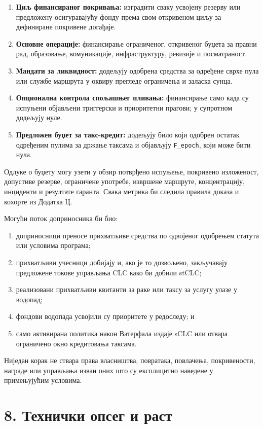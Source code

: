 \documentclass[11pt]{article}
\begin{document}
\begin{enumerate}[leftmargin=*]
\item \textbf{Циљ финансираног покривања:} изградити сваку усвојену резерву или предложену осигуравајућу фонду према свом откривеном циљу за дефиниране покривене догађаје.
\item \textbf{Основне операције:} финансирање ограниченог, откривеног буџета за правни рад, образовање, комуникације, инфраструктуру, ревизије и посматраност.
\item \textbf{Мандати за ликвидност:} додељују одобрена средства за одређене сврхе пула или службе маршрута у оквиру прегледе ограничења и заласка сунца.
\item \textbf{Опционална контрола спољашњег пливања:} финансирање само када су испуњени објављени триггерски и приоритетни прагови; у супротном додељују нуле.
\item \textbf{Предложен буџет за такс-кредит:} додељују било који одобрен остатак одређеним пулима за држање таксама и објављују \texttt{F\_epoch}, који може бити нула.
\end{enumerate}
Одлуке о буџету могу узети у обзир потврђено испуњење, покривено изложеност, допустиве резерве, ограничене употребе, извршене маршруте, концентрацију, инциденти и резултате гаранта. Свака метрика би следила правила доказа и кохорте из Додатка Ц.

Могући поток доприносника би био:

\begin{enumerate}[leftmargin=*]
\item доприносници преносе прихватљиве средства по одвојеног одобрењем статута или условима програма;
\item прихватљиви учесници добијају и, ако је то дозвољено, закључавају предложене токове управљања CLC како би добили stCLC;
\item реализовани прихватљиви квитанти за раке или таксу за услугу улазе у водопад;
\item фондови водопада усвојили су приоритете у редоследу; и
\item само активирана политика након Ватерфала издаје sCLC или отвара ограничено окно кредитовања таксама.
\end{enumerate}
Ниједан корак не ствара права власништва, повратака, повлачења, покривености, награде или управљања изван оних што су експлицитно наведене у примењујућим условима.


\section*{8. Технички опсег и раст}
\end{document}
